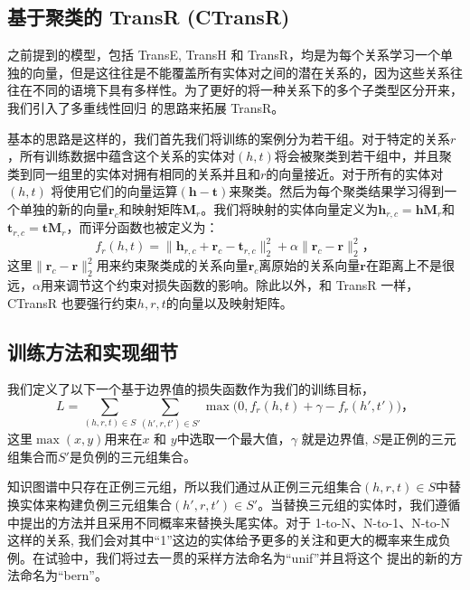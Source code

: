     \subsection{基于聚类的 TransR (CTransR)}
    之前提到的模型，包括 TransE, TransH 和 TransR，均是为每个关系学习一个单独的向量，但是这往往是不能覆盖所有实体对之间的潜在关系的，因为这些关系往往在不同的语境下具有多样性。为了更好的将一种关系下的多个子类型区分开来，我们引入了多重线性回归 \cite{ritzema1994drainage} 的思路来拓展 TransR。

    基本的思路是这样的，我们首先我们将训练的案例分为若干组。对于特定的关系$r$，所有训练数据中蕴含这个关系的实体对$(h, t)$将会被聚类到若干组中，并且聚类到同一组里的实体对拥有相同的关系并且和$r$的向量接近。对于所有的实体对$(h, t)$ 将使用它们的向量运算$(\mathbf{h} - \mathbf{t})$来聚类。然后为每个聚类结果学习得到一个单独的新的向量$\mathbf{r}_c$和映射矩阵$\mathbf{M}_{r}$。我们将映射的实体向量定义为$\mathbf{h}_{r,c} = \mathbf{h}\mathbf{M}_{r}$和$\mathbf{t}_{r,c} = \mathbf{t}\mathbf{M}_{r}$，而评分函数也被定义为：
    \begin{equation}
    f_{r}(h, t) = \|\mathbf{h}_{r, c} + \mathbf{r}_c - \mathbf{t}_{r, c}\|_{2}^{2} + \alpha \|\mathbf{r}_{c} - \mathbf{r}\|_{2}^{2}，
    \end{equation}
    这里$\|\mathbf{r}_{c} - \mathbf{r}\|_{2}^{2}$用来约束聚类成的关系向量$\mathbf{r}_{c}$离原始的关系向量$\mathbf{r}$在距离上不是很远，$\alpha$用来调节这个约束对损失函数的影响。除此以外，和 TransR 一样，CTransR 也要强行约束$h, r, t$的向量以及映射矩阵。

    \subsection{训练方法和实现细节}
    我们定义了以下一个基于边界值的损失函数作为我们的训练目标，
    \begin{equation}
    L = \sum_{(h, r, t) \in S}\sum_{(h', r, t') \in S'}\max \big( 0, f_r(h, t) + \gamma - f_r(h', t')\big)，
    \end{equation}
    这里$\max(x,y)$用来在$x$ 和 $y$中选取一个最大值，$\gamma$ 就是边界值, $S$是正例的三元组集合而$S'$是负例的三元组集合。

    知识图谱中只存在正例三元组，所以我们通过从正例三元组集合$(h, r, t) \in S$中替换实体来构建负例三元组集合$(h', r, t') \in S'$。当替换三元组的实体时，我们遵循 \cite{wang2014knowledge} 中提出的方法并且采用不同概率来替换头尾实体。对于 1-to-N、N-to-1、N-to-N 这样的关系, 我们会对其中``1''这边的实体给予更多的关注和更大的概率来生成负例。在试验中，我们将过去一贯的采样方法命名为``unif''并且将这个 \cite{wang2014knowledge} 提出的新的方法命名为``bern''。

